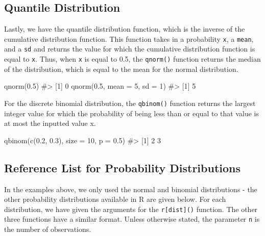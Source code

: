 \documentclass[
  letterpaper,
]{krantz}
\makeatletter
\newenvironment{Shaded}{\begin{snugshade}}{\end{snugshade}}
\newcommand{\AttributeTok}[1]{\textcolor[rgb]{0.40,0.45,0.13}{#1}}
\newcommand{\CommentTok}[1]{\textcolor[rgb]{0.37,0.37,0.37}{#1}}
\newcommand{\DecValTok}[1]{\textcolor[rgb]{0.68,0.00,0.00}{#1}}
\newcommand{\FloatTok}[1]{\textcolor[rgb]{0.68,0.00,0.00}{#1}}
\newcommand{\FunctionTok}[1]{\textcolor[rgb]{0.28,0.35,0.67}{#1}}
\newcommand{\NormalTok}[1]{\textcolor[rgb]{0.00,0.23,0.31}{#1}}
\newenvironment{kframe}{%
\medskip{}
\setlength{\fboxsep}{.8em}
 \def\at@end@of@kframe{}%
 \ifinner\ifhmode%
  \def\at@end@of@kframe{\end{minipage}}%
  \begin{minipage}{\columnwidth}%
 \fi\fi%
 \def\FrameCommand##1{\hskip\@totalleftmargin \hskip-\fboxsep
 \colorbox{shadecolor}{##1}\hskip-\fboxsep
     \hskip-\linewidth \hskip-\@totalleftmargin \hskip\columnwidth}%
 \MakeFramed {\advance\hsize-\width
   \@totalleftmargin\z@ \linewidth\hsize
   \@setminipage}}%
 {\par\unskip\endMakeFramed%
 \at@end@of@kframe}
\renewenvironment{Shaded}{\begin{kframe}}{\end{kframe}}
\makeatother
\begin{document}
\subsection{Quantile Distribution}\label{quantile-distribution}

Lastly, we have the quantile distribution function, which is the inverse
of the cumulative distribution function. This function takes in a
probability \texttt{x}, a \texttt{mean}, and a \texttt{sd} and returns
the value for which the cumulative distribution function is equal to
\texttt{x}. Thus, when \texttt{x} is equal to 0.5, the \texttt{qnorm()}
function returns the median of the distribution, which is equal to the
mean for the normal distribution.

\begin{Shaded}
\begin{Highlighting}[]
\FunctionTok{qnorm}\NormalTok{(}\FloatTok{0.5}\NormalTok{)}
\CommentTok{\#\textgreater{} [1] 0}
\FunctionTok{qnorm}\NormalTok{(}\FloatTok{0.5}\NormalTok{, }\AttributeTok{mean =} \DecValTok{5}\NormalTok{, }\AttributeTok{sd =} \DecValTok{1}\NormalTok{)}
\CommentTok{\#\textgreater{} [1] 5}
\end{Highlighting}
\end{Shaded}

For the discrete binomial distribution, the \texttt{qbinom()} function
returns the largest integer value for which the probability of being
less than or equal to that value is at most the inputted value x.

\begin{Shaded}
\begin{Highlighting}[]
\FunctionTok{qbinom}\NormalTok{(}\FunctionTok{c}\NormalTok{(}\FloatTok{0.2}\NormalTok{, }\FloatTok{0.3}\NormalTok{), }\AttributeTok{size =} \DecValTok{10}\NormalTok{, }\AttributeTok{p =} \FloatTok{0.5}\NormalTok{)}
\CommentTok{\#\textgreater{} [1] 2 3}
\end{Highlighting}
\end{Shaded}

\subsection{Reference List for Probability
Distributions}\label{reference-list-for-probability-distributions}

In the examples above, we only used the normal and binomial
distributions - the other probability distributions available in R are
given below. For each distribution, we have given the arguments for the
\texttt{r{[}dist{]}()} function. The other three functions have a
similar format. Unless otherwise stated, the parameter \texttt{n} is the
number of observations.
\end{document}
